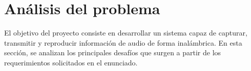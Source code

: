 \section{Análisis del problema}

El objetivo del proyecto consiste en desarrollar un sistema capaz de capturar, transmitir y reproducir información de audio de forma inalámbrica.
En esta sección, se analizan los principales desafíos que surgen a partir de los requerimientos solicitados en el enunciado.

